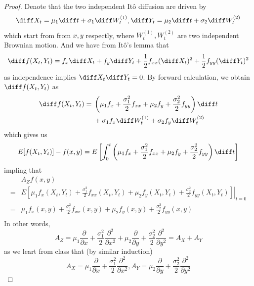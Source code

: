 \problem
\begin{proof}
    Denote that the two independent It\^o diffusion are driven by
    \[\diff X_t=\mu_1\diff t+\sigma_1\diff W_t^{(1)},
    \diff Y_t=\mu_2\diff t+\sigma_2\diff W_t^{(2)}\]
    which start from from $x,y$ respectly,
    where $W_t^{(1)},W_t^{(2)}$ are two independent Brownian motion.
    And we have from It\^o's lemma that
    \[\diff f(X_t,Y_t)=f_x\diff X_t+f_y\diff Y_t+\frac{1}{2}f_{xx}(\diff X_t)^2
    +\frac{1}{2}f_{yy}(\diff Y_t)^2\]
    as independence implies $\diff X_t\diff Y_t=0$. By forward calculation, we obtain
    $\diff f(X_t,Y_t)$ as
    \[\diff f(X_t,Y_t)=\begin{aligned}[t]
    &\left(\mu_1f_x+\frac{\sigma^2_1}{2}f_{xx}
    +\mu_2f_y+\frac{\sigma^2_2}{2}f_{yy}\right)\diff t\\
    &+\sigma_1f_x\diff W_t^{(1)}+\sigma_2f_y\diff W_t^{(2)}
    \end{aligned}\]
    which gives us
    \[E[f(X_t,Y_t)]-f(x,y)=E\left[\int_0^t
    \left(\mu_1f_x+\frac{\sigma_1^2}{2}f_{xx}
    +\mu_2f_y+\frac{\sigma_2^2}{2}f_{yy}\right)\diff t
    \right]\]
    impling that
    \[\begin{aligned}
        &A_Zf(x,y)\\
        =&E\left[\left.\mu_1f_x(X_t,Y_t)+\frac{\sigma_1^2}{2}f_{xx}(X_t,Y_t)
        +\mu_2f_y(X_t,Y_t)+\frac{\sigma_2^2}{2}f_{yy}(X_t,Y_t)\right]\right|_{t=0}\\
        =&\mu_1f_x(x,y)+\frac{\sigma_1^2}{2}f_{xx}(x,y)
        +\mu_2f_y(x,y)+\frac{\sigma_2^2}{2}f_{yy}(x,y)\\
    \end{aligned}\]
    In other words,
    \[A_Z=\mu_1\frac{\partial}{\partial x}
    +\frac{\sigma_1^2}{2}\frac{\partial^2}{\partial x^2}
    +\mu_2\frac{\partial}{\partial y}
    +\frac{\sigma_2^2}{2}\frac{\partial^2}{\partial y^2}
    =A_X+A_Y\]
    as we leart from class that (by similar induction)
    \[A_X=\mu_1\frac{\partial}{\partial x}
    +\frac{\sigma_1^2}{2}\frac{\partial^2}{\partial x^2},
    A_Y=\mu_2\frac{\partial}{\partial y}
    +\frac{\sigma_2^2}{2}\frac{\partial^2}{\partial y^2}\]


\end{proof}

